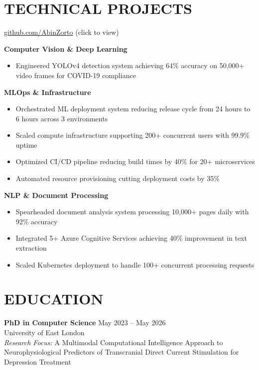 \documentclass[10pt,a4paper]{article}
\begin{document}
\section*{TECHNICAL PROJECTS} 
\href{https://github.com/AbinZorto}{github.com/AbinZorto} {\small\color{secondary}(click to view)}

\textbf{Computer Vision \& Deep Learning}
\begin{itemize}
    \item Engineered YOLOv4 detection system achieving 64\% accuracy on 50,000+ video frames for COVID-19 compliance
\end{itemize}

\textbf{MLOps \& Infrastructure}
\begin{itemize}
    \item Orchestrated ML deployment system reducing release cycle from 24 hours to 6 hours across 3 environments
    \item Scaled compute infrastructure supporting 200+ concurrent users with 99.9\% uptime
    \item Optimized CI/CD pipeline reducing build times by 40\% for 20+ microservices
    \item Automated resource provisioning cutting deployment costs by 35\%
\end{itemize}

\textbf{NLP \& Document Processing}
\begin{itemize}
    \item Spearheaded document analysis system processing 10,000+ pages daily with 92\% accuracy
    \item Integrated 5+ Azure Cognitive Services achieving 40\% improvement in text extraction
    \item Scaled Kubernetes deployment to handle 100+ concurrent processing requests
\end{itemize}

\section*{EDUCATION}

\textbf{PhD in Computer Science} \hfill May 2023 -- May 2026\\
University of East London\\
\textit{Research Focus:} A Multimodal Computational Intelligence Approach to Neurophysiological Predictors of Transcranial Direct Current Stimulation for Depression Treatment\\
\end{document}
